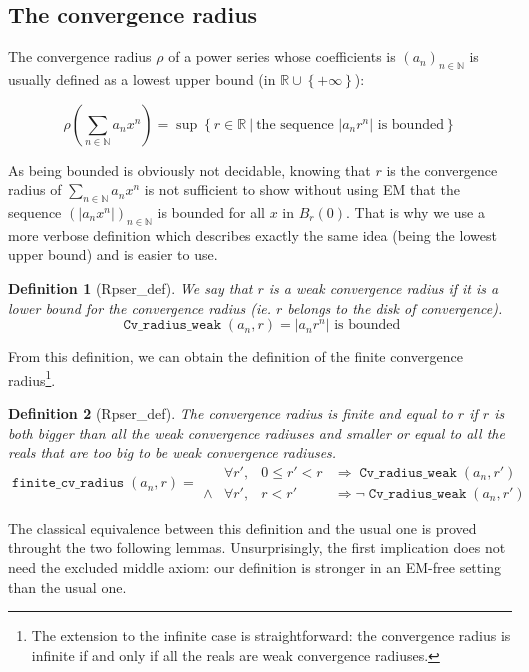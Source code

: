 \documentclass[submission,copyright]{eptcs}
\newcommand{\N}{\mathbb{N}}
\newcommand{\R}{\mathbb{R}}
\DeclareMathOperator{\cvrw}{\mathtt{Cv\_radius\_weak}}
\DeclareMathOperator{\fcvr}{\mathtt{finite\_cv\_radius}}
\newtheorem{definition}{Definition}
\begin{document}
\subsection{The convergence radius}

The convergence radius $\rho$ of a power series whose coefficients is
$(a_n)_{n \in \N}$ is usually defined as a lowest upper bound (in
$\R \cup \left\lbrace +\infty \right\rbrace$):

 $$\rho(\sum_{n \in \N} a_n x^n) = \sup \left\lbrace r \in \R ~|~
   \text{the sequence } \left|a_n r^n\right| \text{ is bounded}
   \right\rbrace$$

As being bounded is obviously not decidable, knowing that $r$ is the
convergence radius of $\sum_{n \in \N} a_n x^n$ is not sufficient to
show without using EM that the sequence $(\left| a_n x^n \right|)
_{n \in \N}$ is bounded for all $x$ in $B_r(0)$. That is why
we use a more verbose definition which describes exactly the same
idea (being the lowest upper bound) and is easier to use.

\begin{definition}[Rpser\_def] We say that $r$ is a weak convergence
radius if it is a lower bound for the convergence radius (ie. $r$ belongs
to the disk of convergence).
$$\cvrw{}(a_n,r) = \left| a_n r^n \right| \text{ is bounded}$$
\end{definition}

From this definition, we can obtain the definition of the finite
convergence radius\footnote{The extension to the infinite case is
straightforward: the convergence radius is infinite if and only if
all the reals are weak convergence radiuses.}.

\begin{definition}[Rpser\_def] The convergence radius is finite and
equal to $r$ if $r$ is both bigger than all the weak convergence radiuses 
and smaller or equal to all the reals that are too big to be weak
convergence radiuses.
$$\fcvr{}(a_n,r) =
\begin{array}{clcl}
        & \forall r', & 0 \le r' < r & \Rightarrow \cvrw{}(a_n,r') \\
 \wedge & \forall r', & r < r' & \Rightarrow \neg \cvrw{}(a_n,r')
\end{array}$$
\end{definition}

The classical equivalence between this definition and the usual one is proved
throught the two following lemmas. Unsurprisingly, the first implication does
not need the excluded middle axiom: our definition is stronger in an EM-free
setting than the usual one.
\end{document}

